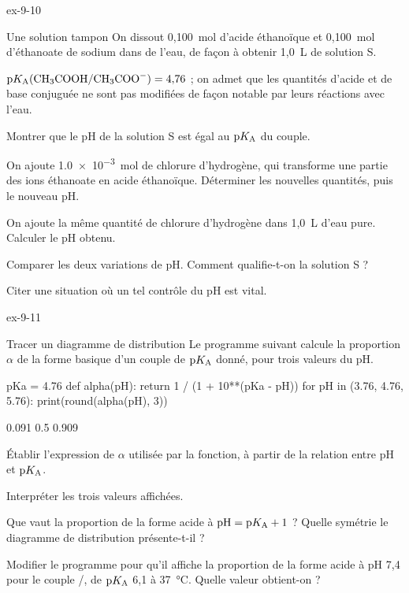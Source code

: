 \begin{blocLivre}{ex-9-10}
\begin{exercice}[2]{Une solution tampon}
On dissout 0,100~mol d'acide éthanoïque et 0,100~mol d'éthanoate de sodium dans de l'eau, de façon à obtenir 1,0~L de
solution S.
\begin{donnees}
$\pKa(\ce{CH3COOH}/\ce{CH3COO-})=4{,}76$ ; on admet que les quantités d'acide et de base conjuguée ne sont pas
modifiées de façon notable par leurs réactions avec l'eau.
\end{donnees}
\begin{questions}
\item Montrer que le pH de la solution S est égal au $\mathrm{p}K_{\mathrm{A}}$ du couple.
\item On ajoute \qty{1,0e-3}{mol} de chlorure d'hydrogène, qui transforme une partie des ions éthanoate en acide
éthanoïque. Déterminer les nouvelles quantités, puis le nouveau pH.
\item On ajoute la même quantité de chlorure d'hydrogène dans 1,0~L d'eau pure. Calculer le pH obtenu.
\item Comparer les deux variations de pH. Comment qualifie-t-on la solution S ?
\item Citer une situation où un tel contrôle du pH est vital.
\end{questions}
\end{exercice}
\end{blocLivre}
\begin{blocLivre}{ex-9-11}
\begin{exercice}[2]{Tracer un diagramme de distribution}
Le programme suivant calcule la proportion $\alpha$ de la forme basique d'un couple de $\mathrm{p}K_{\mathrm{A}}$ donné, pour trois valeurs
du pH.
\begin{python}
pKa = 4.76
def alpha(pH):
    return 1 / (1 + 10**(pKa - pH))
for pH in (3.76, 4.76, 5.76):
    print(round(alpha(pH), 3))
\end{python}
\begin{console}
0.091
0.5
0.909
\end{console}
\begin{questions}
\item {}Établir l'expression de $\alpha$ utilisée par la fonction, à partir de la relation
entre pH et $\mathrm{p}K_{\mathrm{A}}$.
\item Interpréter les trois valeurs affichées.
\item Que vaut la proportion de la forme acide à $\mathrm{pH}=\mathrm{p}K_{\mathrm{A}}+1$ ? Quelle symétrie le diagramme de distribution
présente-t-il ?
\item Modifier le programme pour qu'il affiche la proportion de la forme acide à pH 7,4 pour le couple
/, de $\mathrm{p}K_{\mathrm{A}}$ 6,1 à 37~°C. Quelle valeur obtient-on ?
\end{questions}
\end{exercice}
\end{blocLivre}
